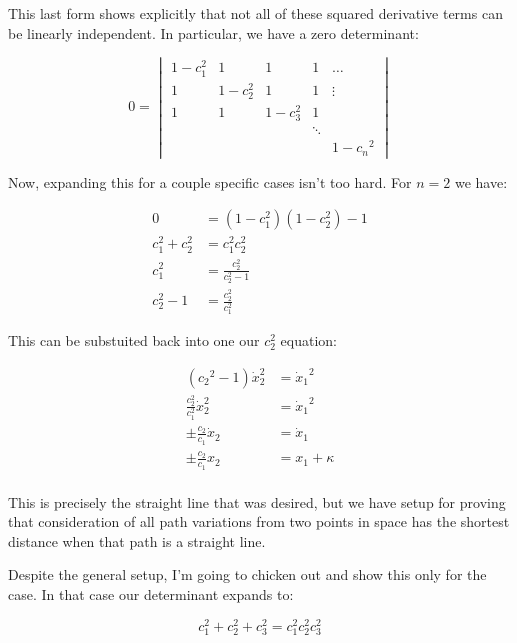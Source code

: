 \documentclass{article}      %
\newcommand{\xdot}[0]{\dot{x}}
\begin{document}
This last form shows explicitly that not all of these squared derivative terms can be linearly independent.  In particular, we have a
zero determinant:

\begin{equation*}
0 =
\begin{vmatrix}
1 - c_1^2   & 1            & 1         & 1 & \hdots \\
1           & 1 - c_2^2    & 1         & 1 & \vdots \\
1           & 1            & 1 - c_3^2 & 1 & \\
            &              &           & \ddots & \\
            &              &           &        & 1 - {c_n}^2
\end{vmatrix}
\end{equation*}

Now, expanding this for a couple specific cases isn't too hard.  For $n=2$ we have:

\begin{align*}
0 &= (1 - c_1^2)(1-c_2^2) - 1 \\
c_1^2 + c_2^2 &= c_1^2 c_2^2 \\
c_1^2 &= \frac{c_2^2}{ c_2^2 - 1 } \\
c_2^2 - 1 &= \frac{c_2^2}{ c_1^2 }
\end{align*}

This can be substuited back into one our $c_2^2$ equation:

\begin{align*}
({c_2}^2 -1)\xdot_2^2 &= {\xdot_1}^2 \\
\frac{c_2^2}{ c_1^2 } \xdot_2^2 &= {\xdot_1}^2 \\
\pm \frac{c_2}{ c_1 } \xdot_2 &= {\xdot_1} \\
\pm \frac{c_2}{ c_1 } x_2 &= x_1 + \kappa \\
\end{align*}

This is precisely the straight line that was desired, but we have setup for proving that consideration of all path variations from two points 
in  space has the shortest distance when that path is a straight line.

Despite the general setup, I'm going to chicken out and show this only for the  case.  In that case our determinant expands to:

\begin{equation*}
c_1^2 + c_2^2 + c_3^2 = c_1^2 c_2^2 c_3^2
\end{equation*}
\end{document}
